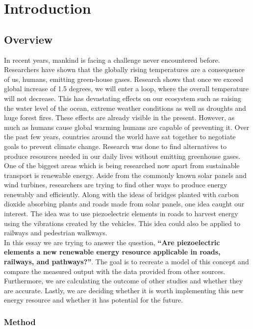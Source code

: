 \chapter{Introduction}

\section{Overview}

In recent years, mankind is facing a challenge never encountered before. Researchers have shown that the globally rising temperatures are a consequence of us, humans, emitting green-house gases. Research shows that once we exceed global increase of 1.5 degrees, we will enter a loop, where the overall temperature will not decrease. This has devastating effects on our ecosystem such as raising the water level of the ocean, extreme weather conditions as well as droughts and huge forest fires. These effects are already visible in the present. However, as much as humans cause global warming humans are capable of preventing it. Over the past few years, countries around the world have sat together to negotiate goals to prevent climate change. Research was done to find alternatives to produce resources needed in our daily lives without emitting greenhouse gases. One of the biggest areas which is being researched now apart from sustainable transport is renewable energy. Aside from the commonly known solar panels and wind turbines, researchers are trying to find other ways to produce energy renewably and efficiently. Along with the ideas of bridges planted with carbon dioxide absorbing plants and roads made from solar panels, one idea caught our interest. The idea was to use piezoelectric elements in roads to harvest energy using the vibrations created by the vehicles. This idea could also be applied to railways and pedestrian walkways. \\
In this essay we are trying to answer the question, \textbf{“Are piezoelectric elements a new renewable energy resource applicable in roads, railways, and pathways?”}. The goal is to recreate a model of this concept and compare the measured output with the data provided from other sources. Furthermore, we are calculating the outcome of other studies and whether they are accurate. Lastly, we are deciding whether it is worth implementing this new energy resource and whether it has potential for the future. 

\subsection{Method}

